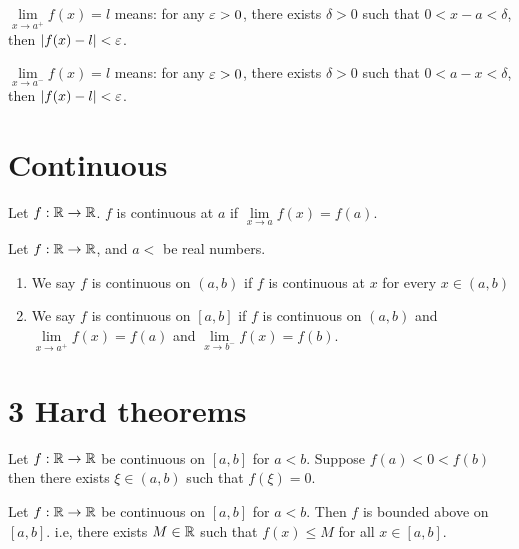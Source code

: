 \begin{definition*}
  $\lim\limits_{x \to a^+} f(x) = l$ means: for any $\varepsilon > 0$, there exists $\delta > 0$ such that $0 < x-a < \delta$, then $|f(x)-l| < \varepsilon$.
\end{definition*}

\begin{definition*}
  $\lim\limits_{x \to a^-} f(x) = l$ means: for any $\varepsilon > 0$, there exists $\delta > 0$ such that $0 < a-x < \delta$, then $|f(x)-l| < \varepsilon$.
\end{definition*}

\section*{Continuous}

\begin{definition*}
  Let $f: \mathbb R \to \mathbb R$.
  $f$ is continuous at $a$ if $\lim\limits_{x \to a} f(x) = f(a)$.
\end{definition*}

\begin{definition*}
  Let $f: \mathbb R \to \mathbb R$, and $a < $ be real numbers.
  \begin{enumerate}
    \item We say $f$ is continuous on $(a, b)$ if $f$ is continuous at $x$ for every $x \in (a, b)$
    \item We say $f$ is continuous on $[a, b]$ if $f$ is continuous on $(a, b)$ and $\lim\limits_{x \to a^+} f(x) = f(a)$ and $\lim\limits_{x \to b^-} f(x) = f(b)$.
  \end{enumerate}
\end{definition*}

\section*{3 Hard theorems}

\begin{theorem*}
  Let $f : \mathbb R \to \mathbb R$ be continuous on $[a, b]$ for $a < b$. Suppose $f(a) < 0 < f(b)$ then there exists $\xi \in (a, b)$ such that $f(\xi) = 0$.
\end{theorem*}

\begin{theorem*}
  Let $f : \mathbb R \to \mathbb R$ be continuous on $[a, b]$ for $a < b$. Then $f$ is bounded above on $[a, b]$.
  i.e, there exists $M \in \mathbb R$ such that $f(x) \le M$ for all $x \in [a, b]$.
\end{theorem*}

